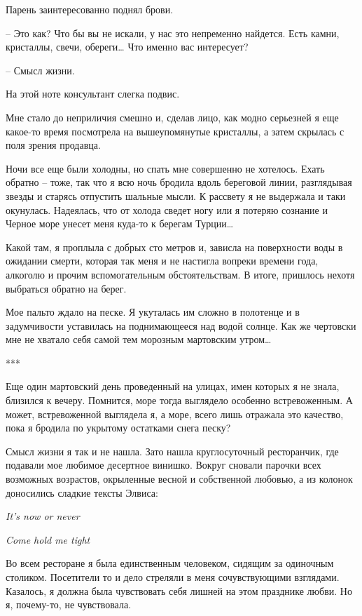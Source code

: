 \documentclass[
]{book}
\begin{document}
Парень заинтересованно поднял брови.

-- Это как? Что бы вы не искали, у нас это непременно найдется. Есть камни, кристаллы, свечи, обереги\ldots{} Что именно вас интересует?

-- Смысл жизни.

На этой ноте консультант слегка подвис.

Мне стало до неприличия смешно и, сделав лицо, как модно серьезней я еще какое-то время посмотрела на вышеупомянутые кристаллы, а затем скрылась с поля зрения продавца.

Ночи все еще были холодны, но спать мне совершенно не хотелось. Ехать обратно -- тоже, так что я всю ночь бродила вдоль береговой линии, разглядывая звезды и старясь отпустить шальные мысли. К рассвету я не выдержала и таки окунулась. Надеялась, что от холода сведет ногу или я потеряю сознание и Черное море унесет меня куда-то к берегам Турции\ldots{}

Какой там, я проплыла с добрых сто метров и, зависла на поверхности воды в ожидании смерти, которая так меня и не настигла вопреки времени года, алкоголю и прочим вспомогательным обстоятельствам. В итоге, пришлось нехотя выбраться обратно на берег.

Мое пальто ждало на песке. Я укуталась им сложно в полотенце и в задумчивости уставилась на поднимающееся над водой солнце. Как же чертовски мне не хватало себя самой тем морозным мартовским утром\ldots{}

***

Еще один мартовский день проведенный на улицах, имен которых я не знала, близился к вечеру. Помнится, море тогда выглядело особенно встревоженным. А может, встревоженной выглядела я, а море, всего лишь отражала это качество, пока я бродила по укрытому остатками снега песку?

Смысл жизни я так и не нашла. Зато нашла круглосуточный ресторанчик, где подавали мое любимое десертное винишко. Вокруг сновали парочки всех возможных возрастов, окрыленные весной и собственной любовью, а из колонок доносились сладкие тексты Элвиса:

\emph{It's now or never}

\emph{Come hold me tight}

Во всем ресторане я была единственным человеком, сидящим за одиночным столиком. Посетители то и дело стреляли в меня сочувствующими взглядами. Казалось, я должна была чувствовать себя лишней на этом празднике любви. Но я, почему-то, не чувствовала.
\end{document}
